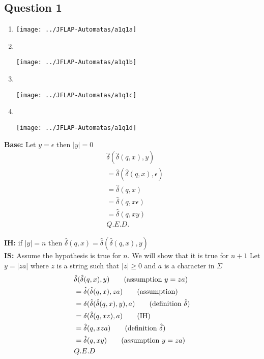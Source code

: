 \documentclass[12pt,a4paper]{article}
\begin{document}
	
	\subsection*{Question 1}
	\begin{enumerate}
		\item
			\begin{center}
				\texttt{[image: ../JFLAP-Automatas/a1q1a]}
			\end{center}
		\item  ~\\		
			\begin{center}
				\texttt{[image: ../JFLAP-Automatas/a1q1b]}
			\end{center}
		
		\begingroup{}
		\item  	~\\ 
		\begin{center}
			\texttt{[image: ../JFLAP-Automatas/a1q1c]}
		\end{center}
		\item  ~\\		
		\begin{center}
			\texttt{[image: ../JFLAP-Automatas/a1q1d]}
		\end{center}
		\endgroup
	\end{enumerate}

\noindent
\textbf{Base:} Let $ y=\epsilon $ then $ |y|=0$
\begin{align*}
&\hat{\delta}(\hat{\delta}(q,x),y)		\tag{assumption}
\\ &=\hat{\delta}(\hat{\delta}(q,x),\epsilon)	\tag{definition}
\\ &=\hat{\delta}(q,x)					\tag{definition}
\\ &=\hat{\delta}(q,x\epsilon)			\tag{definition}
\\ &=\hat{\delta}(q,xy) 				\tag{assumption}
\\ &Q.E.D.
\end{align*}

\noindent
\textbf{IH:} if $|y|=n$ then $\hat{\delta}(q,x)=\hat{\delta}(\hat{\delta}(q,x),y)$\\

\noindent
\textbf{IS:} Assume the hypothesis is true for $n$. We will show that it is true for $n+1$ 
\noindent
Let $y=|za|$ where $z$ is a string such that $|z| \ge 0$ and $a$ is a character in $\Sigma$
\begin{align*}
&\hat{\delta}(\hat{\delta}(q,x),y)				\tag{assumption $y=za$}
\\ &= \hat{\delta}(\hat{\delta}(q,x),za) 		\tag{assumption}
\\ &= \delta(\hat{\delta}(\hat{\delta}(q,x),y),a) \tag{definition $\hat{\delta}$}
\\ &= \delta(\hat{\delta}(q,xz),a)				\tag{IH}
\\ &= \hat{\delta}(q,xza)						\tag{definition $\hat{\delta}$}
\\ &= \hat{\delta}(q,xy)						\tag{assumption $y=za$}
\\ &Q.E.D
\end{align*}
\end{document}
